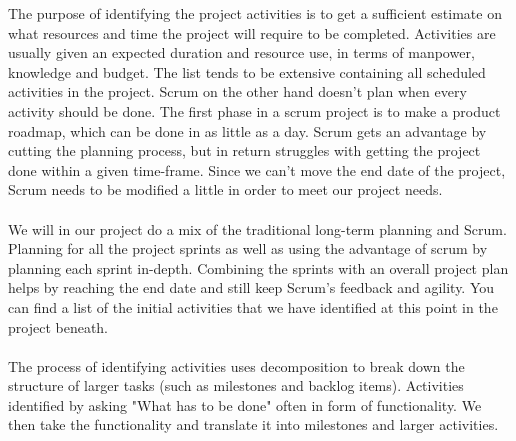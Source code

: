 The purpose of identifying the project activities is to get a sufficient estimate on what resources and time the project will require to be completed. Activities are usually given an expected duration and resource use, in terms of manpower, knowledge and budget. 
The list tends to be extensive containing all scheduled activities in the project. Scrum on the other hand doesn't plan when every activity should be done. The first phase in a scrum project is to make a product roadmap, which can be done in as little as a day. Scrum gets an advantage by cutting the planning process, but in return struggles with getting the project done within a given time-frame. Since we can't move the end date of the project, Scrum needs to be modified a little in order to meet our project needs. \\
\\
We will in our project do a mix of the traditional long-term planning and Scrum. Planning for all the project sprints as well as using the advantage of scrum by planning each sprint in-depth. Combining the sprints with an overall project plan helps by reaching the end date and still keep Scrum's feedback and agility.
 You can find a list of the initial activities that we have identified at this point in the project beneath. \\
\\
The process of identifying activities uses decomposition to break down the structure of larger tasks (such as milestones and backlog items). Activities identified by asking "What has to be done" often in form of functionality. We then take the functionality and translate it into milestones and larger activities. 
